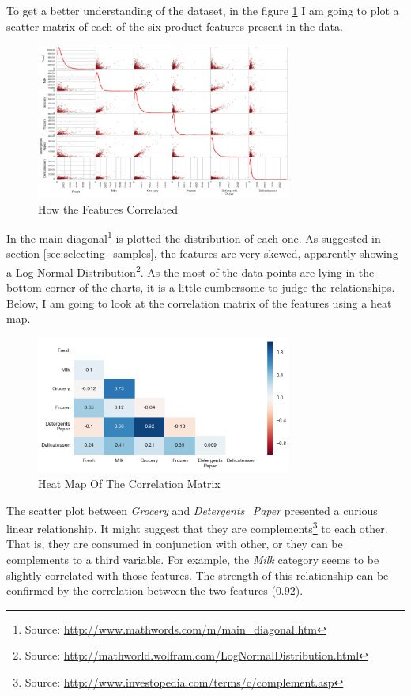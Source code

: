 \documentclass[a4paper]{article}
\begin{document}
To get a better understanding of the dataset, in the figure \ref{fig:scatter_matrix} I am going to plot a scatter matrix of each of the six product features present in the data.

\newpage
\begin{figure}[ht!]
\centering
\includegraphics[width=0.75\textwidth]{figures/scatter_matrix.png}
\caption{\label{fig:scatter_matrix}How the Features Correlated}
\end{figure}

In the main diagonal\footnote{Source: \url{http://www.mathwords.com/m/main_diagonal.htm}} is plotted the distribution of each one. As suggested in section \ref{sec:selecting_samples}, the features are very skewed, apparently showing a Log Normal Distribution\footnote{Source: \url{http://mathworld.wolfram.com/LogNormalDistribution.html}}. As the most of the data points are lying in the bottom corner of the charts, it is a little cumbersome to judge the relationships. Below, I am going to look at the correlation matrix of the features using a heat map.

\begin{figure}[ht!]
\centering
\includegraphics[width=0.75\textwidth]{figures/heatmap.png}
\caption{\label{fig:heatmap}Heat Map Of The Correlation Matrix}
\end{figure}

The scatter plot between \textit{Grocery} and \textit{Detergents\_Paper} presented a curious linear relationship. It might suggest that they are complements\footnote{Source: \url{http://www.investopedia.com/terms/c/complement.asp}} to each other. That is, they are consumed in conjunction with other, or they can be complements to a third variable. For example, the \textit{Milk} category seems to be slightly correlated with those features. The strength of this relationship can be confirmed by the correlation between the two features ($0.92$).
\end{document}
